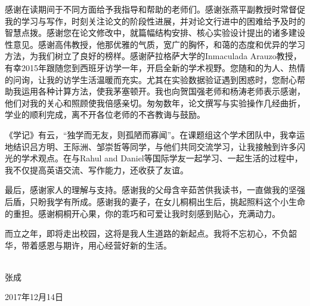 \begin{ack}
感谢在读期间于不同方面给予我指导和帮助的老师们。感谢张燕平副教授时常督促我的学习与写作，时刻关注论文的阶段性进展，并对论文行进中的困难给予及时的智慧点拨。感谢您在论文修改中，就篇幅结构安排、核心实验设计提出的诸多建设性意见。感谢高伟教授，他那优雅的气质，宽广的胸怀，和蔼的态度和优异的学习方法，为我们树立了良好的榜样。感谢萨拉格萨大学的Inmaculada Arauzo教授，有幸2015年跟随您到西班牙访学一年，开启全新的学术视野。您随和的为人、热情的问询，让我的访学生活温暖而充实。尤其在实验数据验证遇到困惑时，您耐心帮助我运用各种计算方法，使我茅塞顿开。我也向贺国强老师和杨涛老师表示感谢，他们对我的关心和照顾使我倍感亲切。匆匆数年，论文撰写与实验操作几经曲折，学业的顺利完成，离不开各位老师的不吝教诲与鼓励。

《学记》有云，“独学而无友，则孤陋而寡闻”。在课题组这个学术团队中，我幸运地结识吕方明、王际洲、邹崇哲等同学，与他们共同交流学习，让我接触到许多闪光的学术观点。在与Rahul and Daniel等国际学友一起学习、一起生活的过程中，我不仅提高英语交流、写作能力，还收获了友谊。

最后，感谢家人的理解与支持。感谢我的父母含辛茹苦供我读书，一直做我的坚强后盾，只盼我学有所成。感谢我的妻子，在女儿桐桐出生后，挑起照料这个小生命的重担。感谢桐桐开心果，你的乖巧和可爱让我时刻感到贴心，充满动力。

而立之年，即将走出校园，这将是我人生道路的新起点。我将不忘初心，不负韶华，带着感恩与期许，用心经营好新的生活。
\\
\\
\begin{flushright}
	张成 
	
	2017年12月14日
\end{flushright}


\end{ack}

